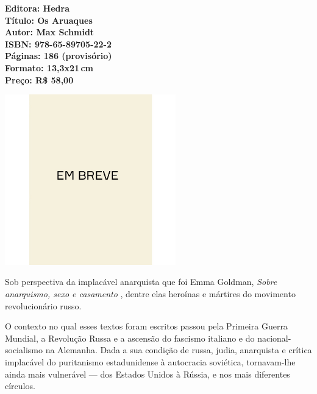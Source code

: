 \vfill
\noindent\begin{minipage}[c]{1\linewidth}
{\small\textbf{
\hspace*{-.1cm}Editora: Hedra\\
Título: Os Aruaques\\
Autor: Max Schmidt\\ 
ISBN: 978-65-89705-22-2\\
Páginas: 186 (provisório)\\
Formato: 13,3x21\,cm\\
Preço: R\$ 58,00\\
}}
\end{minipage}
\pagebreak

\begin{center}
\hspace*{.5cm}\includegraphics[width=74mm]{./CAPAS/breve.jpeg}
\end{center}
\hspace*{-7cm}\hrulefill\hspace*{-7cm}
\medskip

\noindent{}Sob perspectiva da implacável anarquista que foi Emma Goldman, \textit{Sobre anarquismo, sexo e casamento} , dentre elas heroínas e mártires do movimento revolucionário russo. 

O contexto no qual esses textos foram escritos passou pela Primeira Guerra Mundial, a Revolução Russa e a ascensão do fascismo italiano e do nacional-socialismo na Alemanha. Dada a sua condição de russa, judia, anarquista e crítica implacável do puritanismo estadunidense à autocracia soviética, tornavam-lhe ainda mais vulnerável --- dos Estados Unidos à Rússia, e nos mais diferentes círculos.

